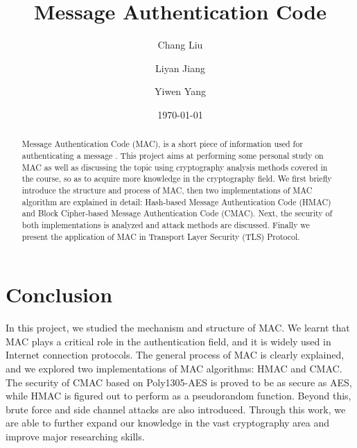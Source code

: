 \documentclass[12pt,a4paper]{article}
\title{Message Authentication Code}
\author[1]{Chang Liu}
\author[1]{Liyan Jiang}
\author[1]{Yiwen Yang}
\affil[1]{Group 4, VE475, UM-JI}
\date{\today}
\begin{document}
\begin{titlepage}
	\maketitle
	\begin{abstract}
		Message Authentication Code (MAC), is a short piece of information used for authenticating a message \cite{crypto-net}. This project aims at performing some personal study on MAC as well as discussing the topic using cryptography analysis methods covered in the course, so as to acquire more knowledge in the cryptography field. We first briefly introduce the structure and process of MAC, then two implementations of MAC algorithm are explained in detail: Hash-based Message Authentication Code (HMAC) and Block Cipher-based Message Authentication Code (CMAC). Next, the security of both implementations is analyzed and attack methods are discussed. Finally we present the application of MAC in Transport Layer Security (TLS) Protocol.
	\end{abstract}
\end{titlepage}
\tableofcontents
\newpage





\section{Conclusion}

	In this project, we studied the mechanism and structure of MAC. We learnt that MAC plays a critical role in the authentication field, and it is widely used in Internet connection protocols. The general process of MAC is clearly explained, and we explored two implementations of MAC algorithms: HMAC and CMAC. The security of CMAC based on Poly1305-AES is proved to be as secure as AES, while HMAC is figured out to perform as a pseudorandom function. Beyond this, brute force and side channel attacks are also introduced. Through this work, we are able to further expand our knowledge in the vast cryptography area and improve major researching skills.

\newpage
\printbibliography
\end{document}
